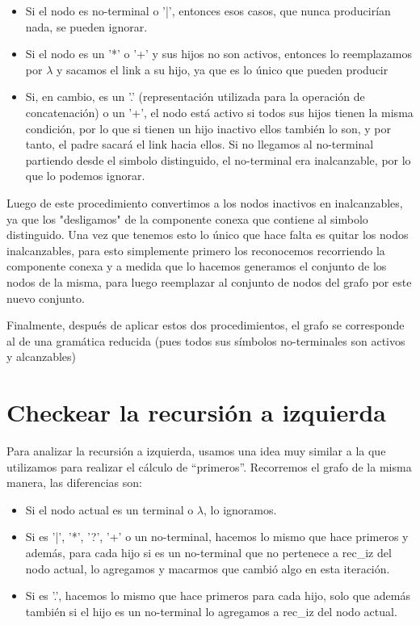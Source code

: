 \documentclass[a4paper]{report}
\begin{document}
\begin{itemize}
\item Si el nodo es no-terminal o '|', entonces esos casos, que nunca producirían nada,
se pueden ignorar.

\item Si el nodo es un '*' o '+' y sus hijos no son activos,
entonces lo reemplazamos por $\lambda$ y sacamos el link a su hijo, ya que es lo
único que pueden producir 

\item Si, en cambio, es un '.' (representaci\'on utilizada para la operaci\'on de concatenaci\'on) o un '+', el nodo est\'a activo si todos sus hijos tienen la misma condici\'on, por lo que si tienen un hijo 
inactivo ellos también lo son, y por tanto,
el padre sacará el link hacia ellos. Si no llegamos al no-terminal partiendo
desde el simbolo distinguido, el no-terminal era inalcanzable, por lo que lo podemos ignorar.
\end{itemize}


	Luego de este procedimiento convertimos a los nodos inactivos en inalcanzables, 
ya que los "desligamos" de la componente conexa que contiene al simbolo distinguido. Una vez 
que tenemos esto lo único que hace falta es quitar los nodos inalcanzables, para esto simplemente 
primero los reconocemos recorriendo la componente conexa y a medida que lo hacemos generamos 
el conjunto de los nodos de la misma, para luego reemplazar al conjunto de nodos del grafo 
por este nuevo conjunto.


	Finalmente, después de aplicar estos dos procedimientos, el grafo se
corresponde al de una gramática reducida (pues todos sus s\'imbolos no-terminales son
activos y alcanzables)


\section*{Checkear la recursi\'on a izquierda}

	Para analizar la recursi\'on a izquierda, usamos una idea muy similar a la que
utilizamos para realizar el c\'alculo de "`primeros"'. Recorremos el grafo de la misma manera, las
diferencias son:


\begin{itemize}

\item Si el nodo actual es un terminal o $\lambda$, lo ignoramos.

\item Si es '|', '*', '?', '+' o un no-terminal, hacemos lo mismo que hace primeros y además, para cada hijo si es un no-terminal que no pertenece a rec\_iz del nodo actual, lo agregamos y macarmos que cambió algo en
esta iteración.

\item Si es '.', hacemos lo mismo que hace primeros para cada hijo, solo que además también si el hijo es un no-terminal lo agregamos a rec\_iz del
nodo actual.

\end{itemize}
\end{document}
